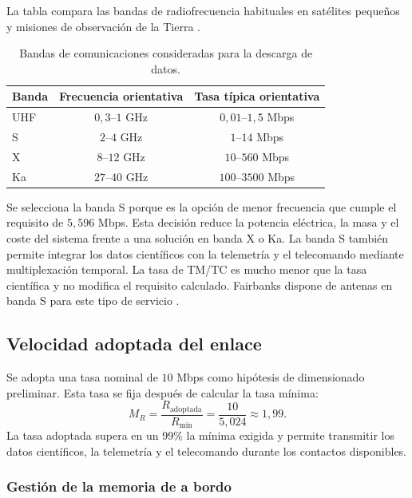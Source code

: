La tabla compara las bandas de radiofrecuencia habituales en satélites pequeños y misiones de observación de la Tierra \cite{nasa2025grounddata,esa_metop_operations,esa_sentinel2_operations}.

\begin{table}[H]
\centering
\caption{Bandas de comunicaciones consideradas para la descarga de datos.}
\label{tab:communication_bands}
\begin{tabular}{@{}lcc@{}}
\toprule
Banda & Frecuencia orientativa & Tasa típica orientativa \\
\midrule
UHF & \(0,3\)--\(1\) GHz & \(0,01\)--\(1,5\) Mbps \\
S   & \(2\)--\(4\) GHz   & \(1\)--\(14\) Mbps \\
X   & \(8\)--\(12\) GHz  & \(10\)--\(560\) Mbps \\
Ka  & \(27\)--\(40\) GHz & \(100\)--\(3500\) Mbps \\
\bottomrule
\end{tabular}
\end{table}


Se selecciona la banda S porque es la opción de menor frecuencia que cumple el requisito de \(5,596\) Mbps. Esta decisión reduce la potencia eléctrica, la masa y el coste del sistema frente a una solución en banda X o Ka. La banda S también permite integrar los datos científicos con la telemetría y el telecomando mediante multiplexación temporal. La tasa de TM/TC es mucho menor que la tasa científica y no modifica el requisito calculado. Fairbanks dispone de antenas en banda S para este tipo de servicio \cite{ASF2025_NSN,noaa_fairbanks_2023}.

\subsection{Velocidad adoptada del enlace}

Se adopta una tasa nominal de \(10\) Mbps como hipótesis de dimensionado preliminar. Esta tasa se fija después de calcular la tasa mínima:
\begin{equation}
M_R=\frac{R_{\mathrm{adoptada}}}{R_{\min}}
    =\frac{10}{5,024}\approx 1,99.
\label{eq:downlink_margin}
\end{equation}
La tasa adoptada supera en un 99\% la mínima exigida y permite transmitir los datos científicos, la telemetría y el telecomando durante los contactos disponibles.

\subsubsection{Gestión de la memoria de a bordo}

